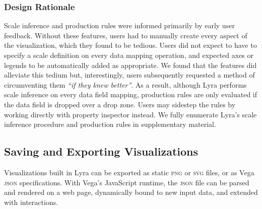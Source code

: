 \vspace{-10pt}

\subsubsection{Design Rationale}

\vspace{-10pt}

Scale inference and production rules were informed primarily by early user
feedback. Without these features, users had to manually create every aspect of
the visualization, which they found to be tedious. Users did not expect to have
to specify a scale definition on every data mapping operation, and expected axes
or legends to be automatically added as appropriate. We found that the features
did alleviate this tedium but, interestingly, users subsequently requested a
method of circumventing them \emph{``if they knew better''}. As a result,
although Lyra performs scale inference on every data field mapping, production
rules are only evaluated if the data field is dropped over a drop zone. Users
may sidestep the rules by working directly with property inspector instead. We
fully enumerate Lyra's scale inference procedure and production rules in
supplementary material.

\vspace{-10pt}

\subsection{Saving and Exporting Visualizations}

\vspace{-7pt}

Visualizations built in Lyra can be exported as static \textsc{png} or
\textsc{svg} files, or as Vega \textsc{json} specifications. With Vega's
JavaScript runtime, the \textsc{json} file can be parsed and rendered on a web
page, dynamically bound to new input data, and extended with interactions.